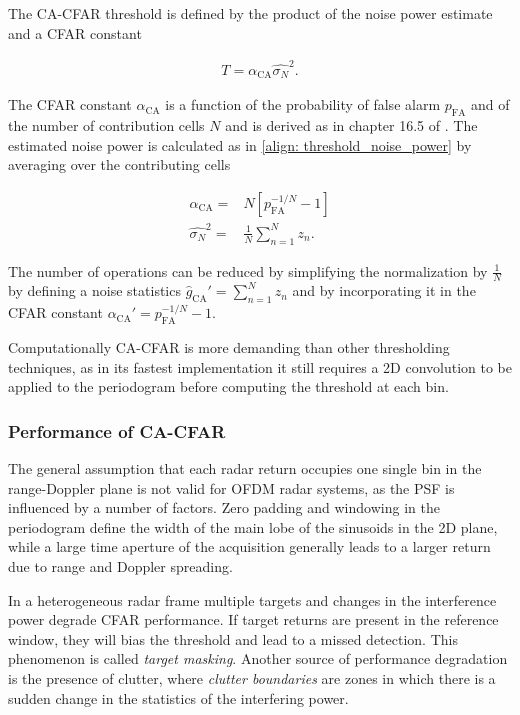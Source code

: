 
The CA-CFAR threshold is defined by the product of the noise power estimate and a CFAR constant

\begin{align}
	T = \alpha_{\text{CA}} \hat{\sigma_N}^2.
\end{align}

The CFAR constant $\alpha_{\text{CA}}$ is a function of the probability of false alarm $p_{\text{FA}}$ and of the number of contribution cells $N$ and is derived as in chapter 16.5 of \cite{Richards_Scheer_Holm_2010}. The estimated noise power is calculated as in \ref{align: threshold_noise_power} by averaging over the contributing cells

\begin{align}
	\alpha_{\text{CA}} =& N[p_{\text{FA}}^{-1/N} - 1] \\
	\hat{\sigma_N}^2 =& \frac{1}{N}\sum_{n=1}^N z_n.
\end{align}

The number of operations can be reduced by simplifying the normalization by $\frac{1}{N}$ by defining a noise statistics $\hat{g}_{\text{CA}}' = \sum_{n=1}^N z_n$ and by incorporating it in the CFAR constant $\alpha_{\text{CA}}' = p_{\text{FA}}^{-1/N} - 1$.

Computationally CA-CFAR is more demanding than other thresholding techniques, as in its fastest implementation it still requires a 2D convolution to be applied to the periodogram before computing the threshold at each bin.

\subsubsection{Performance of CA-CFAR}

The general assumption that each radar return occupies one single bin in the range-Doppler plane is not valid for OFDM radar systems, as the PSF is influenced by a number of factors.
Zero padding and windowing in the periodogram define the width of the main lobe of the sinusoids in the 2D plane, while a large time aperture of the acquisition generally leads to a larger return due to range and Doppler spreading.

In a heterogeneous radar frame multiple targets and changes in the interference power degrade CFAR performance. If target returns are present in the reference window, they will bias the threshold and lead to a missed detection. This phenomenon is called \textit{target masking}. Another source of performance degradation is the presence of clutter, where \textit{clutter boundaries} are zones in which there is a sudden change in the statistics of the interfering power.

